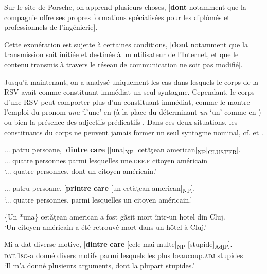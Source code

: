 \ea \label{ch3:ex28}
\ea 
Sur le site de Porsche, on apprend plusieurs choses, [\textbf{dont} notamment que la compagnie offre ses propres formations spécialisées pour les diplômés et professionnels de l’ingénierie]. \label{ch3:ex28a}

\ex
Cette exonération est sujette à certaines conditions, [\textbf{dont} notamment que la transmission soit initiée et destinée à un utilisateur de l’Internet, et que le contenu transmis à travers le réseau de communication ne soit pas modifié]. \label{ch3:ex28b} 
\z 
\z 

Jusqu’à maintenant, on a analysé uniquement les cas dans lesquels le corps de la RSV avait comme constituant immédiat un seul syntagme. Cependant, le corps d’une RSV peut comporter plus d’un constituant immédiat, comme le montre l’emploi du pronom \textit{una} ‘l’une’ en  (à la place du déterminant \textit{un} ‘un’ comme en ) ou bien la présence des adjectifs prédicatifs . Dans ces deux situations, les constituants du corps ne peuvent jamais former un seul syntagme nominal, cf.  et . 

\ea \label{ch3:ex29}
\ea 
\gll ... patru  persoane,  [\textbf{dintre} \textbf{care}  [[una]\textsubscript{NP}  [cetăţean american]\textsubscript{NP}]\textsubscript{CLUSTER}]. \label{ch3:ex29a}\\
... quatre  personnes  parmi  lesquelles  une.\textsc{def.f}  citoyen  américain \\
\glt ‘... quatre personnes, dont un citoyen américain.’

\ex 
... patru persoane, [\textbf{printre} \textbf{care} [un cetăţean american]\textsubscript{NP}]. \label{ch3:ex29b}\\
\glt ‘... quatre personnes, parmi lesquelles un citoyen américain.’

\ex 
\{Un {\textbar} *una\} cetăţean american a fost găsit mort într-un hotel din Cluj. \label{ch3:ex29c}\\
\glt ‘Un citoyen américain a été retrouvé mort dans un hôtel à Cluj.’
\z 
\z 


\ea \label{ch3:ex30}
\ea 
\gll Mi-a  dat  diverse  motive,  [\textbf{dintre} \textbf{care}  [cele  mai  multe]\textsubscript{NP} [stupide]\textsubscript{AdjP}]. \label{ch3:ex30a}\\
\textsc{dat.1sg}{}-a  donné  divers  motifs  parmi  lesquels  les  plus  beaucoup.\textsc{adj} stupides\\
\glt ‘Il m’a donné plusieurs arguments, dont la plupart stupides.’ 

